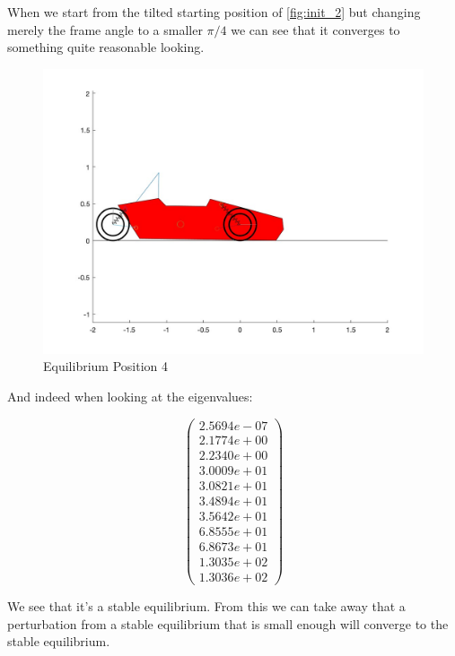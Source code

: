 When we start from the tilted starting position of \ref{fig:init_2} but changing merely the frame angle to a smaller $\pi/4$ we can see that it converges to something quite reasonable looking.
\begin{figure}[ht]
    \centering
    \includegraphics[scale=0.235]{images/Equilibrium4.jpg}
    \caption{Equilibrium Position 4}
    \label{fig:eq_4}
\end{figure}

And indeed when looking at the eigenvalues:

\begin{equation}
    \begin{pmatrix}
        2.5694e-07\\
        2.1774e+00\\
        2.2340e+00\\
        3.0009e+01\\
        3.0821e+01\\
        3.4894e+01\\
        3.5642e+01\\
        6.8555e+01\\
        6.8673e+01\\
        1.3035e+02\\
        1.3036e+02
    \end{pmatrix}
\end{equation}

We see that it's a stable equilibrium. From this we can take away that a perturbation from a stable equilibrium that is small enough will converge to the stable equilibrium.   
